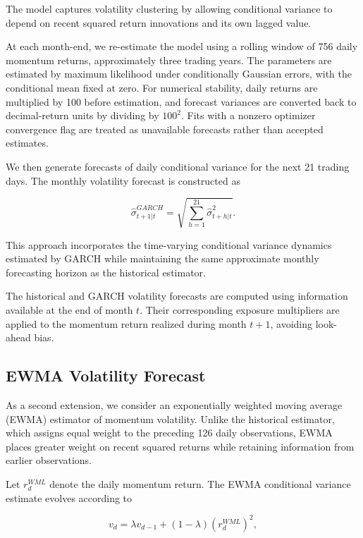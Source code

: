 \documentclass[11pt]{article}
\begin{document}
The model captures volatility clustering by
allowing conditional variance to depend on
recent squared return innovations and its
own lagged value.

At each month-end, we re-estimate the model
using a rolling window of 756 daily momentum
returns, approximately three trading years.
The parameters are estimated by maximum
likelihood under conditionally Gaussian errors,
with the conditional mean fixed at zero. For numerical
stability, daily returns are multiplied by 100 before
estimation, and forecast variances are converted back to
decimal-return units by dividing by $100^2$. Fits with a
nonzero optimizer convergence flag are treated as unavailable
forecasts rather than accepted estimates.

We then generate forecasts of daily conditional
variance for the next 21 trading days.
The monthly volatility forecast is constructed as

\begin{equation}
\widehat{\sigma}_{t+1|t}^{GARCH}
=
\sqrt{
\sum_{h=1}^{21}
\widehat{\sigma}_{t+h|t}^{2}
}.
\label{eq:garch_monthly}
\end{equation}

This approach incorporates the time-varying
conditional variance dynamics estimated by
GARCH while maintaining the same approximate
monthly forecasting horizon as the historical
estimator.

The historical and GARCH volatility forecasts are computed using
information available at the end of month $t$.
Their corresponding exposure multipliers are
applied to the momentum return realized during
month $t+1$, avoiding look-ahead bias.


\subsection{EWMA Volatility Forecast}

As a second extension, we consider an exponentially weighted
moving average (EWMA) estimator of momentum volatility.
Unlike the historical estimator, which assigns equal weight
to the preceding 126 daily observations, EWMA places
greater weight on recent squared returns while retaining
information from earlier observations.

Let $r_d^{WML}$ denote the daily momentum return.
The EWMA conditional variance estimate evolves according to

\begin{equation}
    v_d = \lambda v_{d-1}
    + (1-\lambda)(r_d^{WML})^2,
\end{equation}
\end{document}
